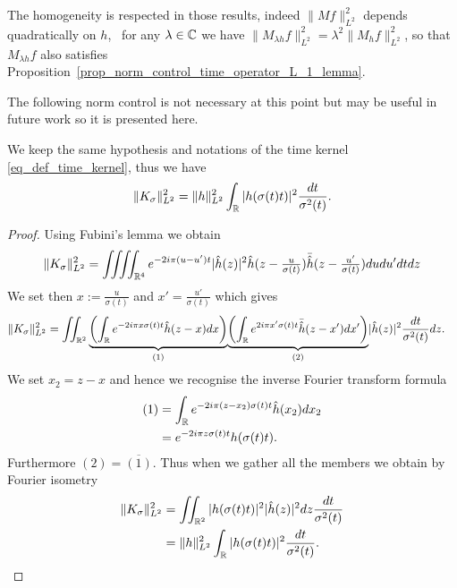 The homogeneity is respected in those results, indeed $\|Mf\|_{L^2}^2$ depends quadratically on $h$, \ie\, for any $\lambda\in\mathbb{C}$ we have $\|M_{\lambda h}f\|_{L^2}^2 = \lambda^2 \|M_h f\|_{L^2}^2$, so that $M_{\lambda h}f$ also satisfies Proposition~\ref{prop_norm_control_time_operator_L_1_lemma}.



The following norm control is not necessary at this point but may be useful in future work so it is presented here.
\begin{prop}
	We keep the same hypothesis and notations of the time kernel \ref{eq_def_time_kernel}, thus we have
	\begin{equation}
		\|K_\sigma \|_{L^2}^2 = \|h\|_{L^2}^2 \int_{\mathbb{R}} |h(\sigma(t)t)|^2\frac{dt}{\sigma^2(t)}.
	\end{equation}
\end{prop}
\begin{proof}
	Using Fubini's lemma we obtain
	\begin{equation*}
		\|K_\sigma\|_{L^2}^2 = \iiiint_{\mathbb{R}^4} e^{-2i\pi(u-u')t}|\hat{h}(z)|^2\hat{h}(z-\tfrac{u}{\sigma(t)})\bar{\hat{h}}(z-\tfrac{u'}{\sigma(t)})dudu'dtdz
	\end{equation*}
	We set then $x:=\tfrac{u}{\sigma(t)}$ and $x'=\tfrac{u'}{\sigma(t)}$ which gives
	\begin{align*}
		\|K_\sigma\|_{L^2}^2  &= \iint_{\mathbb{R}^2} \underset{(1)}{\underbrace{\left( \int_{\mathbb{R}} e^{-2i\pi x\sigma(t)t}\hat{h}(z-x)dx \right)}}\underset{(2)}{\underbrace{\left( \int_{\mathbb{R}} e^{2i\pi x'\sigma(t)t}\bar{\hat{h}}(z-x')dx' \right)}}|\hat{h}(z)|^2 \frac{dt}{\sigma^2(t)}dz.
	\end{align*}
	We set $x_2=z-x$ and hence we recognise the inverse Fourier transform formula
	\begin{align*}
		(1) &= \int_{\mathbb{R}} e^{-2i\pi(z-x_2)\sigma(t)t}\hat{h}(x_2)dx_2 \\
		& = e^{-2i\pi z\sigma(t)t}h(\sigma(t)t).
	\end{align*}
	Furthermore $(2) = \overline{(1)} $. Thus when we gather all the members we obtain by Fourier isometry
	\begin{align*}
		\|K_\sigma\|_{L^2}^2 &= \iint_{\mathbb{R}^2} |h(\sigma(t)t)|^2 |\hat{h}(z)|^2 dz \frac{dt}{\sigma^2(t)} \\
		& = \|h\|_{L^2}^2 \int_{\mathbb{R}} |h(\sigma(t)t)|^2\frac{dt}{\sigma^2(t)}.
	\end{align*}
\end{proof}




